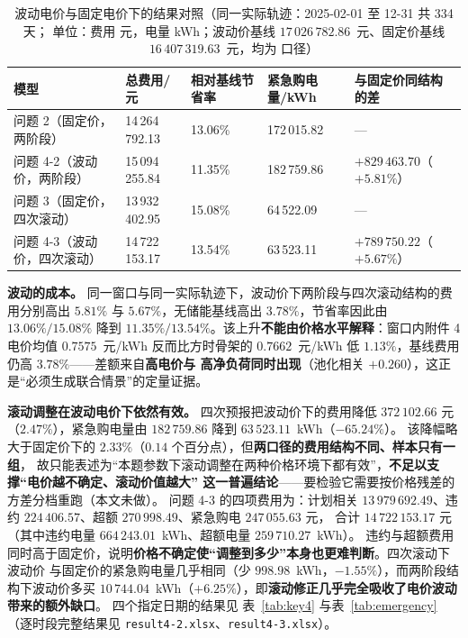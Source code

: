 \begin{table}[htbp]
  \centering
  \caption{波动电价与固定电价下的结果对照（同一实际轨迹：2025-02-01 至 12-31 共 334 天；
           单位：费用 元，电量 kWh；波动价基线 \(17\,026\,782.86\)~元、固定价基线
           \(16\,407\,319.63\)~元，均为  口径）}
  \label{tab:q4-summary}
  \footnotesize
  \setlength{\tabcolsep}{4pt}
  \begin{tabularx}{\linewidth}{L{3.35cm} C{2.35cm} C{2.05cm} C{2.15cm} Y}
    \toprule
    模型 & 总费用/\unit{元} & 相对基线节省率 & 紧急购电量/\unit{kWh} & 与固定价同结构的差 \\
    \midrule
    问题 2（固定价，两阶段） & 14\,264\,792.13 & 13.06\% & 172\,015.82 & --- \\
    问题 4-2（波动价，两阶段） & 15\,094\,255.84 & 11.35\% & 182\,759.86 & \(+829\,463.70\)（\(+5.81\%\)） \\
    问题 3（固定价，四次滚动） & 13\,932\,402.95 & 15.08\% & 64\,522.09 & --- \\
    问题 4-3（波动价，四次滚动） & 14\,722\,153.17 & 13.54\% & 63\,523.11 & \(+789\,750.22\)（\(+5.67\%\)） \\
    \bottomrule
  \end{tabularx}
\end{table}

\textbf{波动的成本。} 同一窗口与同一实际轨迹下，波动价下两阶段与四次滚动结构的费用分别高出
\(5.81\%\) 与 \(5.67\%\)，无储能基线高出 \(3.78\%\)，节省率因此由 \(13.06\%/15.08\%\) 降到
\(11.35\%/13.54\%\)。该上升\textbf{不能由价格水平解释}：窗口内附件 4 电价均值 \(0.7575\)~元/kWh
反而比方时骨架的 \(0.7662\)~元/kWh 低 \(1.13\%\)，基线费用仍高 \(3.78\%\)——差额来自\textbf{高电价与
高净负荷同时出现}（池化相关 \(+0.260\)），这正是“必须生成联合情景”的定量证据。

\textbf{滚动调整在波动电价下依然有效。} 四次预报把波动价下的费用降低 \(372\,102.66\) 元
（\(2.47\%\)），紧急购电量由 \(182\,759.86\) 降到 \(63\,523.11\)~kWh（\(-65.24\%\)）。
该降幅略大于固定价下的 \(2.33\%\)（\(0.14\) 个百分点），但\textbf{两口径的费用结构不同、样本只有一组}，
故只能表述为“本题参数下滚动调整在两种价格环境下都有效”，\textbf{不足以支撑“电价越不确定、滚动价值越大”
这一普遍结论}——要检验它需要按价格残差的方差分档重跑（本文未做）。
问题 4-3 的四项费用为：计划相关
\(13\,979\,692.49\)、违约 \(224\,406.57\)、超额 \(270\,998.49\)、紧急购电 \(247\,055.63\) 元，
合计 \(14\,722\,153.17\) 元（其中违约电量 \(664\,243.01\)~kWh、超额电量 \(259\,710.27\)~kWh）。
违约与超额费用同时高于固定价，说明\textbf{价格不确定使“调整到多少”本身也更难判断}。四次滚动下波动价
与固定价的紧急购电量几乎相同（少 \(998.98\)~kWh，\(-1.55\%\)），而两阶段结构下波动价多买
\(10\,744.04\)~kWh（\(+6.25\%\)），即\textbf{滚动修正几乎完全吸收了电价波动带来的额外缺口}。
四个指定日期的结果见 表~\ref{tab:key4} 与表~\ref{tab:emergency}
（逐时段完整结果见 \texttt{result4-2.xlsx}、\texttt{result4-3.xlsx}）。
